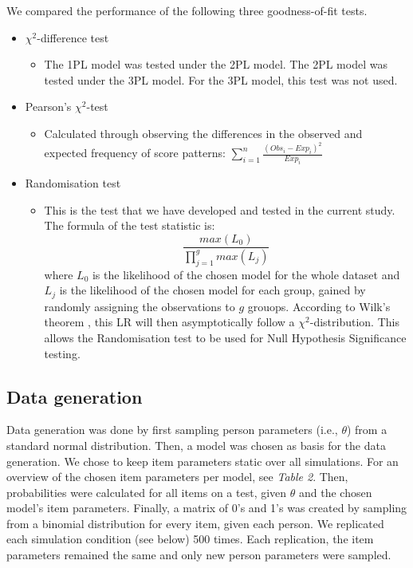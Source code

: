 \documentclass[Royal,sageapa,times,doublespace]{sagej}
\begin{document}
We compared the performance of the following three goodness-of-fit tests.
\begin{itemize}
\item{$\chi^2$-difference test}
	\begin{itemize}
	\item{The 1PL model was tested under the 2PL model. The 2PL model was tested under the 3PL model. For the 3PL model, this test was not used.}
	\end{itemize}
\item{Pearson's $\chi^2$-test}
	\begin{itemize}
	\item{Calculated through observing the differences in the observed and expected frequency of score patterns: $\sum_{i = 1}^{n}\frac{(Obs_i - Exp_i)^2}{Exp_i}$}
	\end{itemize}
\item{Randomisation test}
	\begin{itemize}
	\item{This is the test that we have developed and tested in the current study. The formula of the test statistic is:
	\begin{equation}
		\frac{max(L_0)}{\prod_{j = 1}^g max(L_j)}
	\end{equation} where $L_0$ is the likelihood of the chosen model for the whole dataset and $L_j$ is the likelihood of the chosen model for each group, gained by randomly assigning the observations to $g$ grouops. According to Wilk's theorem \cite{willkth}, this LR will then asymptotically follow a $\chi^2$-distribution. This allows the Randomisation test to be used for Null Hypothesis Significance testing.} 
	\end{itemize}
\end{itemize}

\subsection{Data generation}
Data generation was done by first sampling person parameters (i.e., $\theta$) from a standard normal distribution. Then, a model was chosen as basis for the data generation. We chose to keep item parameters static over all simulations. For an overview of the chosen item parameters per model, see \textit{Table 2}. Then, probabilities were calculated for all items on a test, given $\theta$ and the chosen model's item parameters. Finally, a matrix of 0's and 1's was created by sampling from a binomial distribution for every item, given each person. We replicated each simulation condition (see below) 500 times. Each replication, the item parameters remained the same and only new person parameters were sampled.
\end{document}
